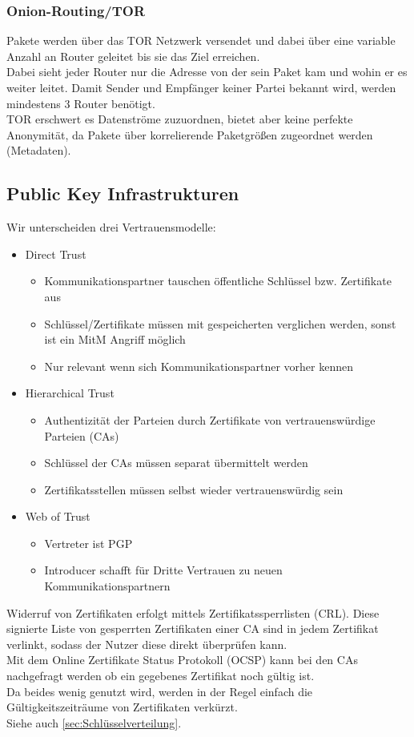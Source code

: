 \documentclass[a4paper,12pt,leqno]{article}
\begin{document}
\subsubsection{Onion-Routing/TOR}
Pakete werden über das TOR Netzwerk versendet und dabei über eine variable Anzahl an Router geleitet bis sie das Ziel erreichen.\\
Dabei sieht jeder Router nur die Adresse von der sein Paket kam und wohin er es weiter leitet. Damit Sender und Empfänger keiner Partei bekannt wird, werden mindestens 3 Router benötigt.\\
TOR erschwert es Datenströme zuzuordnen, bietet aber keine perfekte Anonymität, da Pakete über korrelierende Paketgrößen zugeordnet werden (Metadaten).

\subsection{Public Key Infrastrukturen}

Wir unterscheiden drei Vertrauensmodelle:
\begin{itemize}
\item Direct Trust
	\begin{itemize}
		\item Kommunikationspartner tauschen öffentliche Schlüssel bzw. Zertifikate aus
		\item Schlüssel/Zertifikate müssen mit gespeicherten verglichen werden, sonst ist ein MitM Angriff möglich
		\item Nur relevant wenn sich Kommunikationspartner vorher kennen
	\end{itemize}
\item Hierarchical Trust
	\begin{itemize}
		\item Authentizität der Parteien durch Zertifikate von vertrauenswürdige Parteien (CAs)
		\item Schlüssel der CAs müssen separat übermittelt werden
		\item Zertifikatsstellen müssen selbst wieder vertrauenswürdig sein
	\end{itemize}
\item Web of Trust
	\begin{itemize}
		\item Vertreter ist PGP
		\item Introducer schafft für Dritte Vertrauen zu neuen Kommunikationspartnern
	\end{itemize}
\end{itemize}

Widerruf von Zertifikaten erfolgt mittels Zertifikatssperrlisten (CRL). Diese signierte Liste von gesperrten Zertifikaten einer CA sind in jedem Zertifikat verlinkt, sodass der Nutzer diese direkt überprüfen kann.\\
Mit dem Online Zertifikate Status Protokoll (OCSP) kann bei den CAs nachgefragt werden ob ein gegebenes Zertifikat noch gültig ist.\\
Da beides wenig genutzt wird, werden in der Regel einfach die Gültigkeitszeiträume von Zertifikaten verkürzt.\\

Siehe auch \ref{sec:Schlüsselverteilung}.
\end{document}
